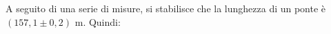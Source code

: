 A seguito di una serie di misure, si stabilisce che la 
lunghezza di un ponte è $(157,1 \pm 0,2)$ m. 
Quindi:
